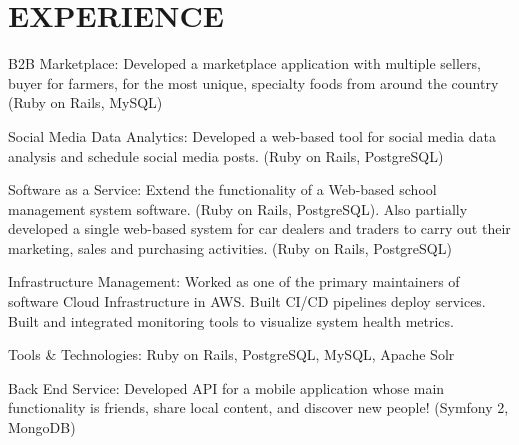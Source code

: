 \documentclass[letterpaper]{deedy-resume} %
\begin{document}
\begin{minipage}[t]{0.66\textwidth} %


\section{EXPERIENCE}

\sectionspace %



\begin{tightitemize}
\item
\item B2B Marketplace:
Developed a marketplace application with multiple sellers, buyer for farmers, for the most unique, specialty foods from around the country (Ruby on Rails, MySQL)
\item Social Media Data Analytics:
Developed a web-based tool for social media data analysis and schedule social media posts. (Ruby on Rails, PostgreSQL)
\item Software as a Service:
Extend the functionality of a Web-based school management system software. (Ruby on Rails, PostgreSQL). Also partially developed a single web-based system for car dealers and traders to carry out their marketing, sales and purchasing activities. (Ruby on Rails, PostgreSQL)
\item Infrastructure Management:
Worked as one of the primary maintainers of software Cloud Infrastructure in AWS. Built CI/CD pipelines deploy services. Built and integrated monitoring tools to visualize system health metrics. 
\item Tools & Technologies: Ruby on Rails, PostgreSQL, MySQL, Apache Solr
\end{tightitemize}

\sectionspace %


\sectionspace 
\begin{tightitemize}
\item Back End Service:
Developed API for a mobile application whose main functionality is friends, share local content, and discover new people! (Symfony 2, MongoDB)


\end{tightitemize}
\end{minipage}
\end{document}
